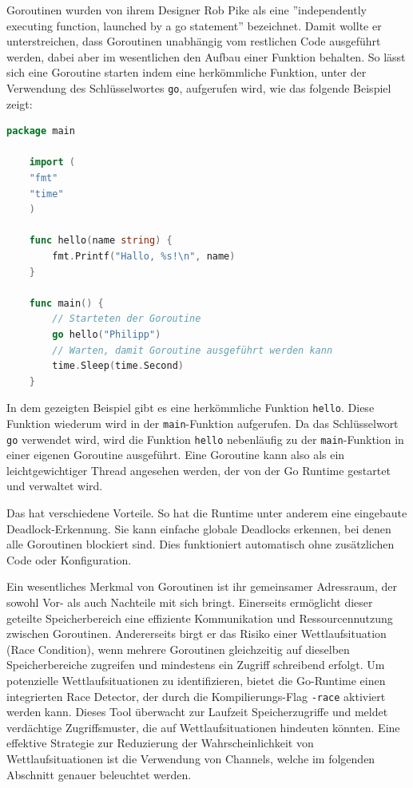 \documentclass[fontsize=12pt,paper=a4,twoside=semi,parskip=half-,headsepline,headinclude]{scrreprt}
\begin{document}
Goroutinen wurden von ihrem Designer Rob Pike als eine ''independently executing function, launched by a go statement''\cite{Pike2012} bezeichnet. Damit wollte er unterstreichen, dass Goroutinen unabhängig vom restlichen Code ausgeführt werden, dabei aber im wesentlichen den Aufbau einer Funktion behalten. So lässt sich eine Goroutine starten indem eine herkömmliche Funktion, unter der Verwendung des Schlüsselwortes \texttt{go}, aufgerufen wird, wie das folgende Beispiel zeigt:

\begin{lstlisting}[language=Go,extendedchars=true]
	package main
	
	import (
	"fmt"
	"time"
	)
	
	func hello(name string) {
		fmt.Printf("Hallo, %s!\n", name)
	}
	
	func main() {
		// Starteten der Goroutine
		go hello("Philipp")
		// Warten, damit Goroutine ausgeführt werden kann
		time.Sleep(time.Second)
	}
\end{lstlisting}

In dem gezeigten Beispiel gibt es eine herkömmliche Funktion \texttt{hello}. Diese Funktion wiederum wird in der \texttt{main}-Funktion aufgerufen. Da das Schlüsselwort \texttt{go} verwendet wird, wird die Funktion \texttt{hello} nebenläufig zu der \texttt{main}-Funktion in einer eigenen Goroutine ausgeführt. Eine Goroutine kann also als ein leichtgewichtiger Thread angesehen werden, der von der Go Runtime gestartet und verwaltet wird. 

Das hat verschiedene Vorteile. So hat die Runtime unter anderem eine eingebaute Dead\-lock-Erkennung. Sie kann einfache globale Deadlocks erkennen, bei denen alle Goroutinen blockiert sind. Dies funktioniert automatisch ohne zusätzlichen Code oder Konfiguration.

Ein wesentliches Merkmal von Goroutinen ist ihr gemeinsamer Adressraum, der sowohl Vor- als auch Nachteile mit sich bringt. Einerseits ermöglicht dieser geteilte Speicherbereich eine effiziente Kommunikation und Ressourcennutzung zwischen Goroutinen. Andererseits birgt er das Risiko einer Wettlaufsituation (Race Condition), wenn mehrere Goroutinen gleichzeitig auf dieselben Speicherbereiche zugreifen und mindestens ein Zugriff schreibend erfolgt. Um potenzielle Wettlaufsituationen zu identifizieren, bietet die Go-Runtime einen integrierten Race Detector\cite{DataRace2024}, der durch die Kompilierungs-Flag \texttt{-race} aktiviert werden kann. Dieses Tool überwacht zur Laufzeit Speicherzugriffe und meldet verdächtige Zugriffsmuster, die auf Wettlaufsituationen hindeuten könnten. Eine effektive Strategie zur Reduzierung der Wahrscheinlichkeit von Wettlaufsituationen ist die Verwendung von Channels, welche im folgenden Abschnitt genauer beleuchtet werden.
\end{document}
